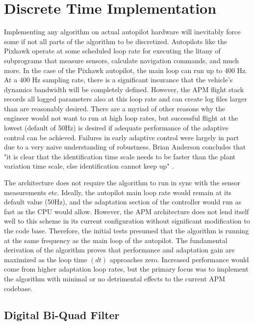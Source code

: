 \section{\Lone Discrete Time Implementation}
Implementing any algorithm on actual autopilot hardware will inevitably force some if not all parts of the algorithm to be discretized.  Autopilots like the Pixhawk operate at some scheduled loop rate for executing the litany of subprograms that measure sensors, calculate navigation commands, and much more.  In the case of the Pixhawk autopilot, the main loop can run up to 400 Hz.  At a 400 Hz sampling rate, there is a significant insurance that the vehicle's dynamics bandwidth will be completely defined.  However, the \ac{APM} flight stack records all logged parameters also at this loop rate and can create log files larger than are reasonably desired.  There are a myriad of other reasons why the engineer would not want to run at high loop rates, but successful flight at the lowest (default of 50Hz) is desired if adequate performance of the adaptive control can be achieved.  Failures in early adaptive control were largely in part due to a very naive understanding of robustness.  Brian Anderson concludes that "it is clear that the identification time scale needs to be faster than the plant variation time scale, else identification cannot keep up" \cite{anderson2005failures}.  

The \Lone architecture does not require the algorithm to run in sync with the sensor measurements etc.  Ideally, the autopilot main loop rate would remain at its default value (50Hz), and the adaptation section of the \Lone controller would run as fast as the CPU would allow.  However, the \ac{APM} architecture does not lend itself well to this scheme in its current configuration without significant modification to the code base.  Therefore, the initial tests presumed that the \Lone algorithm is running at the same frequency as the main loop of the autopilot.  The fundamental derivation of the \Lone algorithm proves that performance and adaptation gain are maximized as the loop time $(dt)$ approaches zero.  Increased performance would come from higher adaptation loop rates, but the primary focus was to implement the \Lone algorithm with minimal or no detrimental effects to the current \ac{APM} codebase.

\subsection{Digital Bi-Quad Filter}

